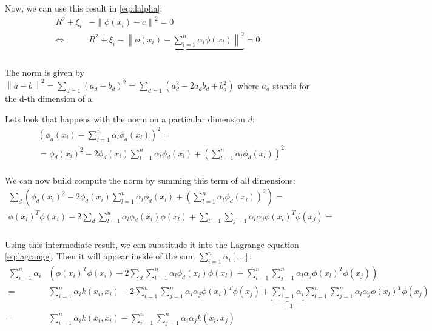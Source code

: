 Now, we can use this result in \eqref{eq:dalpha}:
\renewcommand{\norm}[1]{\left\lVert#1\right\rVert}
\begin{align}
    \label{eq:}
        R^2 +  \xi_i & - \norm{\phi(x_i) - c}^2  = 0 \\
        \iff &
        R^2 +  \xi_i - \underbrace{\norm{\phi(x_i) -\sum_{l=1}^n \alpha_l \phi(x_l) }^2}_{}  = 0 \\
\end{align}

The norm is given by $\norm{a - b}^2 = \sum_{d=1} (a_d - b_d)^2
= \sum_{d=1} (a_d^2 - 2 a_d b_d + b_d^2 ) $ where $a_d$ stands for the d-th dimension of a.

Lets look that happens with the norm on a particular dimension $d$:
\begin{align}
    \label{eq:}
     &\left( \phi_d(x_{i})  - \sum_{l=1}^n \alpha_l \phi_d(x_l) \right)^2 =  \\
    & = \phi_d(x_i)^2 - 2 \phi_d(x_i) \sum_{l=1}^n \alpha_l \phi_d(x_l)
    + \left(\sum_{l=1}^n \alpha_l \phi_d(x_l) \right)^2  \\
\end{align}

We can now build compute the norm by summing this term of all dimensions:
\begin{align}
    \label{eq:}
    \sum_d \left( \phi_d(x_i)^2 - 2 \phi_d(x_i) \sum_{l=1}^n \alpha_l \phi_d(x_l)
    + \left(\sum_{l=1}^n \alpha_l \phi_d(x_l) \right)^2 \right) = \\
    \phi(x_i)^T \phi(x_i) - 2 \sum_d \sum_{l=1}^n \alpha_l \phi_d(x_i) \phi(x_l) +
     \sum_{l=1} \sum_{j=1} \alpha_l \alpha_j \phi(x_l)^T \phi(x_j) = \\
\end{align}

Using this intermediate result, we can substitude it into the Lagrange equation \eqref{eq:lagrange}.
Then it will appear inside of the sum  $\sum_{i=1}^n \alpha_i [\ldots]$:
\begin{align}
    \sum_{i=1}^n \alpha_i & \left(
    \phi(x_i)^T \phi(x_i) - 2 \sum_d \sum_{l=1}^n \alpha_l \phi_d(x_i) \phi(x_l) +
         \sum_{l=1}^n \sum_{j=1}^n \alpha_l \alpha_j \phi(x_l)^T \phi(x_j)
   \right) \\
    = & \sum_{i=1}^n \alpha_i k(x_i, x_i) - 2
    \sum_{i=1}^n \sum_{j=1}^n \alpha_i \alpha_j \phi(x_i)^T \phi(x_j) +
    \underbrace{\sum_{i=1}^n \alpha_i}_{=1} \sum_{l=1}^n \sum_{j=1}^n \alpha_l \alpha_j \phi(x_l)^T \phi(x_j) \\
    = & \sum_{i=1}^n \alpha_i k(x_i, x_i) -
    \sum_{i=1}^n \sum_{j=1}^n \alpha_i \alpha_j k(x_i, x_j)
\end{align}

